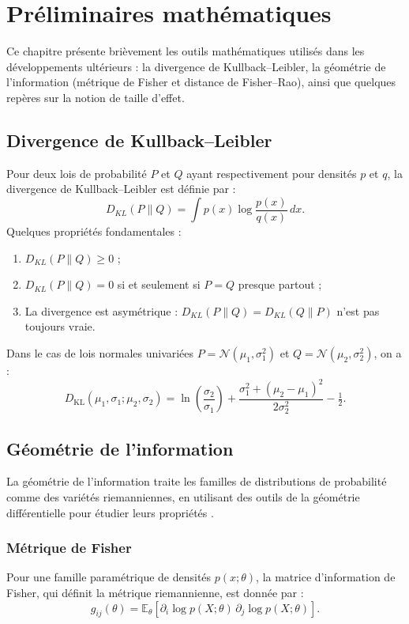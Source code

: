 \chapter{Préliminaires mathématiques}
\label{chap:math}
Ce chapitre présente brièvement les outils mathématiques utilisés dans les développements ultérieurs : la divergence de Kullback–Leibler, la géométrie de l'information (métrique de Fisher et distance de Fisher–Rao), ainsi que quelques repères sur la notion de taille d'effet.

\section{Divergence de Kullback–Leibler}
Pour deux lois de probabilité $P$ et $Q$ ayant respectivement pour densités $p$ et $q$, la divergence de Kullback–Leibler est définie par \citep{ay2017information} :
\begin{equation}
	D_{KL}(P\|Q) = \int p(x)\log\frac{p(x)}{q(x)}\,dx.
\end{equation}
Quelques propriétés fondamentales :
\begin{enumerate}
	\item $D_{KL}(P\|Q) \ge 0$ ;
	\item $D_{KL}(P\|Q) = 0$ si et seulement si $P = Q$ presque partout ;
	\item La divergence est asymétrique : $D_{KL}(P\|Q) = D_{KL}(Q\|P)$ n'est pas toujours vraie.
\end{enumerate}
Dans le cas de lois normales univariées $P = \mathcal{N}(\mu_1, \sigma_1^2)$ et $Q = \mathcal{N}(\mu_2, \sigma_2^2)$, on a \citep{belov2011distributions} :
\begin{equation}
	D_{\mathrm{KL}}(\mu_{1},\sigma_{1};\mu_{2},\sigma_{2})
	= \ln\left(\frac{\sigma_{2}}{\sigma_{1}}\right)
	+ \frac{\sigma_{1}^{2}+(\mu_{2}-\mu_{1})^{2}}{2\sigma_{2}^{2}} - \tfrac{1}{2}.
	\label{eq:kl_normal}
\end{equation}

\section{Géométrie de l'information}
La géométrie de l'information traite les familles de distributions de probabilité comme des variétés riemanniennes, en utilisant des outils de la géométrie différentielle pour étudier leurs propriétés \citep{ay2017information}.

\subsection{Métrique de Fisher}
Pour une famille paramétrique de densités $p(x;\theta)$, la matrice d'information de Fisher, qui définit la métrique riemannienne, est donnée par :
\begin{equation}
	g_{ij}(\theta) = \mathbb{E}_{\theta}\!\left[\partial_{i}\log p(X;\theta)\,\partial_{j}\log p(X;\theta)\right].
\end{equation}

